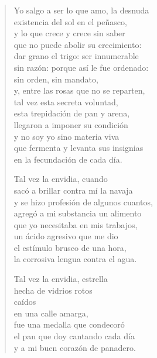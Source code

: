 \documentclass[12pt]{article}
\begin{document}
\begin{verse}
Yo salgo a ser lo que amo, la desnuda\\
existencia del sol en el peñasco,\\
y lo que crece y crece sin saber\\
que no puede abolir su crecimiento:\\
dar grano el trigo: ser innumerable\\
sin razón: porque así le fue ordenado:\\
sin orden, sin mandato,\\
y, entre las rosas que no se reparten,\\
tal vez esta secreta voluntad,\\
esta trepidación de pan y arena,\\
llegaron a imponer su condición\\
y no soy yo sino materia viva\\
que fermenta y levanta sus insignias\\
en la fecundación de cada día.  

Tal vez la envidia, cuando\\
sacó a brillar contra mí la navaja\\
y se hizo profesión de algunos cuantos,\\
agregó a mi substancia un alimento\\
que yo necesitaba en mis trabajos,\\
un ácido agresivo que me dio\\
el estímulo brusco de una hora,\\
la corrosiva lengua contra el agua.  

Tal vez la envidia, estrella\\
hecha de vidrios rotos\\
caídos\\
en una calle amarga,\\
fue una medalla que condecoró\\
el pan que doy cantando cada día\\
y a mi buen corazón de panadero.  

\end{verse}
\end{document}
